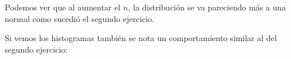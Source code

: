 \documentclass[a4paper]{article}
\begin{document}
	Podemos ver que al aumentar el $n$, la distribuci\'on se va pareciendo m\'as a una normal como sucedi\'o el segundo ejercicio.
	
	Si vemos los histogramas tambi\'en se nota un comportamiento similar al del segundo ejercicio:
	
	\begin{figure}[H]
		\centering
		\hfill
	\end{figure}
	
\end{document}
